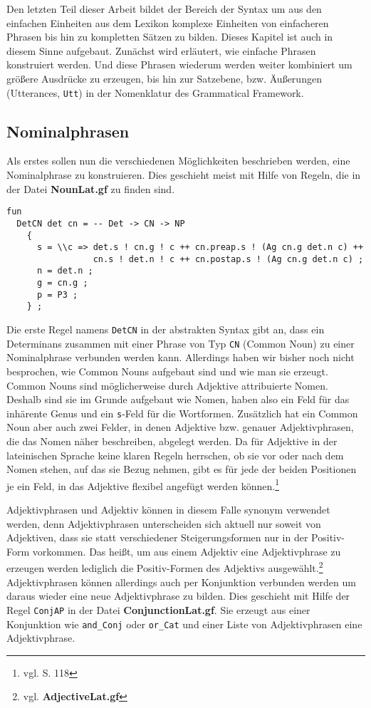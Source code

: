 Den letzten Teil dieser Arbeit bildet der Bereich der Syntax um aus den einfachen Einheiten aus dem Lexikon komplexe Einheiten von einfacheren Phrasen bis hin zu kompletten Sätzen zu bilden. Dieses Kapitel ist auch in diesem Sinne aufgebaut. Zunächst wird erläutert, wie einfache Phrasen konstruiert werden. Und diese Phrasen wiederum werden weiter kombiniert um größere Ausdrücke zu erzeugen, bis hin zur Satzebene, bzw. Äußerungen (Utterances, \texttt{Utt}) in der Nomenklatur des Grammatical Framework.
\subsection{Nominalphrasen}
\label{subsec:nominalphrasen}
Als erstes sollen nun die verschiedenen Möglichkeiten beschrieben werden, eine Nominalphrase zu konstruieren. Dies geschieht meist mit Hilfe von Regeln, die in der Datei \textbf{NounLat.gf} zu finden sind. \par
\begin{lstlisting}[float=ht,caption={Die Syntaxregel \texttt{DetCN}},label={GF-Noun-DetCN}]
fun
  DetCN det cn = -- Det -> CN -> NP
    {
      s = \\c => det.s ! cn.g ! c ++ cn.preap.s ! (Ag cn.g det.n c) ++ 
                 cn.s ! det.n ! c ++ cn.postap.s ! (Ag cn.g det.n c) ; 
      n = det.n ;  
      g = cn.g ; 
      p = P3 ;
    } ;
\end{lstlisting}
Die erste Regel namens \texttt{DetCN} in der abstrakten Syntax gibt an, dass ein Determinans zusammen mit einer Phrase von Typ \texttt{CN} (Common Noun) zu einer Nominalphrase verbunden werden kann. Allerdings haben wir bisher noch nicht besprochen, wie Common Nouns aufgebaut sind und wie man sie erzeugt. Common Nouns sind möglicherweise durch Adjektive attribuierte Nomen. Deshalb sind sie im Grunde aufgebaut wie Nomen, haben also ein Feld für das inhärente Genus und ein \texttt{s}-Feld für die Wortformen. Zusätzlich hat ein Common Noun aber auch zwei Felder, in denen Adjektive bzw. genauer Adjektivphrasen, die das Nomen näher beschreiben, abgelegt werden. Da für Adjektive in der lateinischen Sprache keine klaren Regeln herrschen, ob sie vor oder nach dem Nomen stehen, auf das sie Bezug nehmen, gibt es für jede der beiden Positionen je ein Feld, in das Adjektive flexibel angefügt werden können.\footnote{vgl. \cite{BAYER-LINDAUER1994} S. 118} \par
Adjektivphrasen und Adjektiv können in diesem Falle synonym verwendet werden, denn Adjektivphrasen unterscheiden sich aktuell nur soweit von Adjektiven, dass sie statt verschiedener Steigerungsformen nur in der Positiv-Form vorkommen. Das heißt, um aus einem Adjektiv eine Adjektivphrase zu erzeugen werden lediglich die Positiv-Formen des Adjektivs ausgewählt.\footnote{vgl. \textbf{AdjectiveLat.gf}} Adjektivphrasen können allerdings auch per Konjunktion verbunden werden um daraus wieder eine neue Adjektivphrase zu bilden. Dies geschieht mit Hilfe der Regel \texttt{ConjAP} in der Datei \textbf{ConjunctionLat.gf}. Sie erzeugt aus einer Konjunktion wie \texttt{and\_Conj} oder \texttt{or\_Cat} und einer Liste von Adjektivphrasen eine Adjektivphrase. \par

